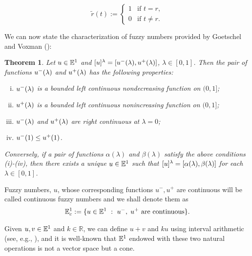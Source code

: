 \documentclass{amsart}
\newtheorem{theorem}{Theorem}[section]
\newcommand{\fn}{\mathbb{E}\sp{1}}
\begin{document}
\[
\tilde{r}(t):=\left\{
\begin{array}{lc}
1 & \text{if } t=r,\\[1ex]
0 & \text{if } t\neq r.
\end{array}\right.
\]


We can now state the characterization of fuzzy numbers provided by Goetschel and Voxman (\cite{GV}):


\begin{theorem}\label{GW1}
Let $u\in\fn$ and $[u]\sp{\lambda}=[u^-(\lambda),u^+(\lambda)]$, $\lambda\in
 [0,1]$.
Then the pair of functions $u\sp{-}(\lambda)$ and
$u\sp{+}(\lambda)$ has the following properties:

\begin{enumerate}[(i)]
 \item $u\sp{-}(\lambda)$ is a bounded left continuous nondecreasing function
on $\mathopen(0,1\mathclose]$;

\item  $u\sp{+}(\lambda)$ is a bounded left continuous nonincreasing function
on $\mathopen (0,1\mathclose]$;

\item $u\sp{-}(\lambda)$ and $u\sp{+}(\lambda)$ are right continuous at
$\lambda=0$;

\item $u\sp{-}(1)\leq u\sp{+}(1)$.
\end{enumerate}
Conversely, if a pair of functions $\alpha (\lambda)$ and
$\beta(\lambda)$ satisfy the above conditions (i)-(iv), then there
exists a unique $u\in\fn$ such that
$[u]\sp{\lambda}=\mathopen[\alpha(\lambda),\beta(\lambda)\mathclose]$
for each $\lambda\in [0,1]$.
\end{theorem}

Fuzzy numbers, $u$, whose corresponding functions $u^-, u^+$ are continuous will be called continuous fuzzy numbers and we shall denote them as
$$\fn_{c}:=\{ u\in\fn\ :\ u^-,\; u^+ \ \text{are continuous}\}.$$



Given $u,v\in \fn$ and $k\in \mathbb{R}$, we can define
$u+v$ and $ku$ using interval arithmetic (see, e.g., \cite{DK:1994}), and
it is well-known that $\fn$ endowed with these two natural operations
is not a vector space but a cone.
\end{document}
